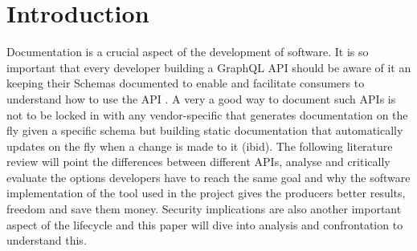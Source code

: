 \section{Introduction}
\label{s:Literature-Introduction}
Documentation is a crucial aspect of the development of software. It is so
important that every developer building a GraphQL API should be aware of it an
keeping their Schemas documented to enable and facilitate consumers to
understand how to use the API \citep{derksDocumentingGraphQLAPIs2021}. A very a
good way to document such APIs is not to be locked in with any vendor-specific
that generates documentation on the fly given a specific schema but building
static documentation that automatically updates on the fly when a change is made
to it (ibid). The following literature review will point the differences between
different APIs, analyse and critically evaluate the options developers have to
reach the same goal and why the software implementation of the tool used in the
project gives the producers better results, freedom and save them money. Security
implications are also another important aspect of the lifecycle and this paper
will dive into analysis and confrontation to understand this.


